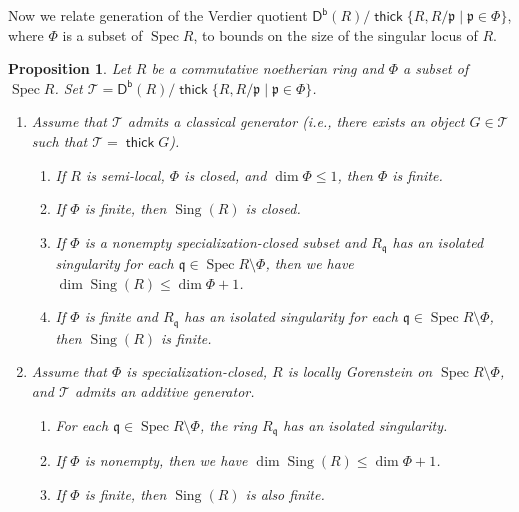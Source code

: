 \documentclass[10pt]{amsart}
\newtheorem{prop}[thm]{Proposition}
\theoremstyle{definition}
\theoremstyle{remark}
\numberwithin{equation}{thm}
\def\db{\operatorname{\mathsf{D^b}}}
\def\dim{\operatorname{dim}}
\def\le{\leqslant}
\def\p{\mathfrak{p}}
\def\q{\mathfrak{q}}
\def\Sing{\operatorname{Sing}}
\def\Spec{\operatorname{Spec}}
\def\T{\mathcal{T}}
\def\thick{\operatorname{\mathsf{thick}}}
\begin{document}
Now we relate generation of the Verdier quotient $\db(R)/\thick\{R,R/\p\mid \p\in\Phi\}$, where $\Phi$ is a subset of $\Spec R$, to bounds on the size of the singular locus of $R$.
\begin{prop}\label{sing}
Let $R$ be a commutative noetherian ring and $\Phi$ a subset of $\Spec R$.
Set $\T=\db(R)/\thick\{R,R/\p\mid\p\in\Phi\}$.
\begin{enumerate}[\rm(1)]
\item
Assume that $\T$ admits a classical generator (i.e., there exists an object $G\in\T$ such that $\T=\thick G$).
\begin{enumerate}[\rm(a)]
\item
If $R$ is semi-local, $\Phi$ is closed, and $\dim\Phi\le 1$, then $\Phi$ is finite.
\item
If $\Phi$ is finite, then $\Sing(R)$ is closed.
\item
If $\Phi$ is a nonempty specialization-closed subset and $R_{\q}$ has an isolated singularity for each $\q\in\Spec R\setminus\Phi$, then we have $\dim\Sing(R)\le \dim\Phi +1$.
\item
If $\Phi$ is finite and $R_{\q}$ has an isolated singularity for each $\q\in\Spec R\setminus\Phi$, then $\Sing(R)$ is finite.
\end{enumerate}
\item
Assume that $\Phi$ is specialization-closed, $R$ is locally Gorenstein on $\Spec R\setminus\Phi$, and $\T$ admits an additive generator.
\begin{enumerate}[\rm(a)]
\item
For each $\q\in\Spec R\setminus\Phi$, the ring $R_{\q}$ has an isolated singularity.
\item
If $\Phi$ is nonempty, then we have $\dim\Sing(R)\le \dim\Phi +1$.
\item
If $\Phi$ is finite, then $\Sing(R)$ is also finite.
\end{enumerate}
\end{enumerate}
\end{prop}
\end{document}
